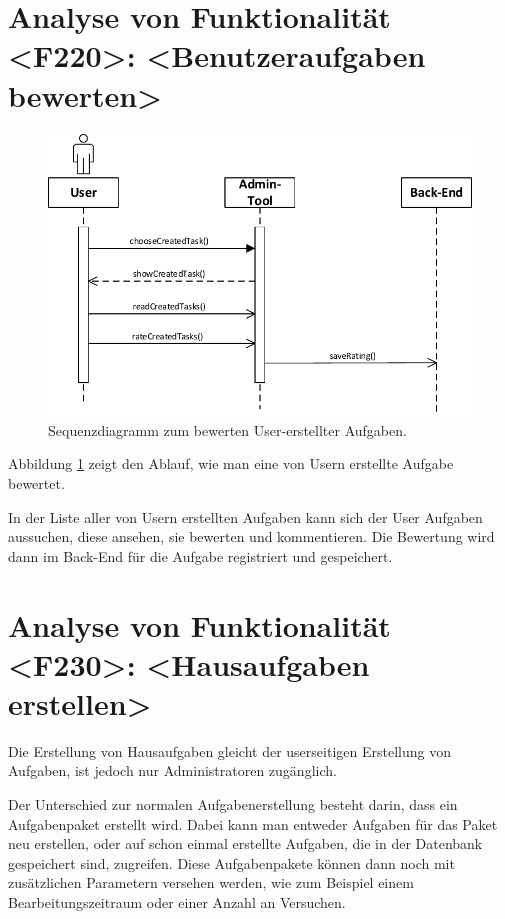 \newpage
\section{Analyse von Funktionalität <F220>: <Benutzeraufgaben bewerten>}
\begin{figure}[h]
\centering
\includegraphics[width=0.9
\textwidth]{figures/sequenz_F220.pdf}
\caption{Sequenzdiagramm zum bewerten User-erstellter Aufgaben.}
\label{sequence_f220}
\end{figure}
Abbildung \ref{sequence_f220} zeigt den Ablauf, wie man eine von Usern erstellte Aufgabe bewertet.

In der Liste aller von Usern erstellten Aufgaben kann sich der User Aufgaben aussuchen, diese ansehen, sie bewerten und kommentieren. Die Bewertung wird dann im Back-End für die Aufgabe registriert und gespeichert. 

\newpage
\section{Analyse von Funktionalität <F230>: <Hausaufgaben erstellen>}

Die Erstellung von Hausaufgaben gleicht der userseitigen Erstellung von Aufgaben, ist jedoch nur Administratoren zugänglich.

Der Unterschied zur normalen Aufgabenerstellung besteht darin, dass ein Aufgabenpaket erstellt wird. Dabei kann man entweder Aufgaben für das Paket neu erstellen, oder auf schon einmal erstellte Aufgaben, die in der Datenbank gespeichert sind, zugreifen. Diese Aufgabenpakete können dann noch mit zusätzlichen Parametern versehen werden, wie zum Beispiel einem Bearbeitungszeitraum oder einer Anzahl an Versuchen. 
